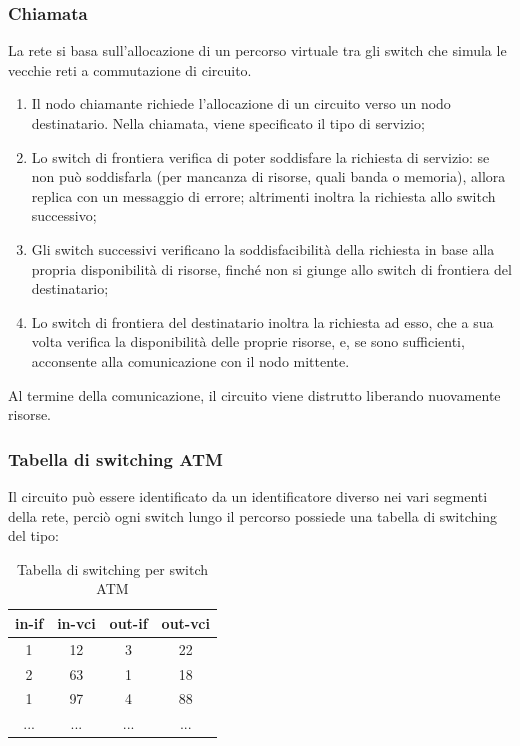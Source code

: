\documentclass[12pt,a4paper]{article}
\begin{document}
\subsubsection{Chiamata}
La rete si basa sull'allocazione di un percorso virtuale tra gli switch
che simula le vecchie reti a commutazione di circuito.

\begin{enumerate}
  \item Il nodo chiamante richiede l'allocazione di un circuito verso un
    nodo destinatario. Nella chiamata, viene specificato il tipo di
    servizio;
  \item Lo switch di frontiera verifica di poter soddisfare la richiesta
    di servizio: se non può soddisfarla (per mancanza di risorse, quali
    banda o memoria), allora replica con un messaggio di errore;
    altrimenti inoltra la richiesta allo switch successivo;
  \item Gli switch successivi verificano la soddisfacibilità della
    richiesta in base alla propria disponibilità di risorse, finché non
    si giunge allo switch di frontiera del destinatario;
  \item Lo switch di frontiera del destinatario inoltra la richiesta ad
    esso, che a sua volta verifica la disponibilità delle proprie
    risorse, e, se sono sufficienti, acconsente alla comunicazione con
    il nodo mittente.
\end{enumerate}

Al termine della comunicazione, il circuito viene distrutto liberando
nuovamente risorse.

\subsubsection{Tabella di switching ATM}
Il circuito può essere identificato da un identificatore diverso nei
vari segmenti della rete, perciò ogni switch lungo il percorso possiede
una tabella di switching del tipo:
\begin{table}[H]
  \centering
  \begin{tabular}{ c c | c c }
  in-if & in-vci  & out-if  & out-vci \\ \hline
  1     & 12      & 3       & 22      \\
  2     & 63      & 1       & 18      \\
  1     & 97      & 4       & 88      \\
  ...   & ...     & ...     & ...
  \end{tabular}
  \caption{Tabella di switching per switch ATM}
\end{table}
\end{document}

